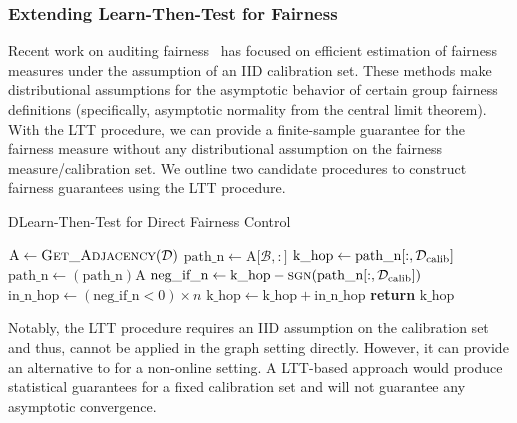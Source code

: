 \subsubsection{Extending Learn-Then-Test for Fairness}
Recent work on auditing fairness~\citep{singh2023brief,singh2023disparitymeasures} has focused on efficient estimation of fairness measures under the assumption of an IID calibration set.
These methods make distributional assumptions for the asymptotic behavior of certain group fairness definitions (specifically, asymptotic normality from the central limit theorem).
With the LTT procedure, we can provide a finite-sample guarantee for the fairness measure without any distributional assumption on the fairness measure/calibration set.
We outline two candidate procedures to construct fairness guarantees using the LTT procedure.
\begin{algorithm}
    \caption{DLearn-Then-Test for Direct Fairness Control}\label{alg:LTT:Direct}
    \begin{algorithmic}[1]
        \State $\text{A}\gets \Call{\text{Get\_Adjacency}}{\mathcal{D}}$ 
        \State $\text{path\_n}\gets \text{A[$\mathcal{B},:$]}$
        \State $\text{k\_hop}\gets \text{path\_n[$:,\mathcal{D_{\mathrm{calib}}}$]}$
            \State $\text{path\_n} \gets (\text{path\_n})\text{A}$
            \State $\text{neg\_if\_n}\gets \text{k\_hop}-\Call{\text{sgn}}{\text{path\_n[$:,\calib$]}}$
            \State $\text{in\_n\_hop}\gets (\text{neg\_if\_n}<0)\times n$ 
            \State $\text{k\_hop} \gets \text{k\_hop} + \text{in\_n\_hop}$
        \EndFor\label{khopendwhile}
        \State \textbf{return} $\text{k\_hop}$
    \EndProcedure
    \end{algorithmic}
    \end{algorithm}



Notably, the LTT procedure requires an IID assumption on the calibration set and thus, cannot be applied in the graph setting directly.
However, it can provide an alternative to \AVOIRmethodname{} for a non-online setting.
A LTT-based approach would produce statistical guarantees for a fixed calibration set and will not guarantee any asymptotic convergence.

